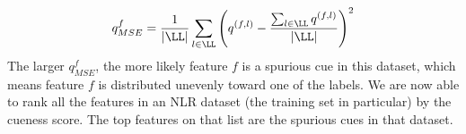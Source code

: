 \begin{equation}
q_{MSE}^{f} = \frac{1}{|\LL|} \sum_{l \in \LL}\left(q^{(f,l)} - \frac{\sum_{l \in \LL} q^{(f,l)}}{|\LL|}\right)^2
\end{equation}
The larger $q_{MSE}^f$, the more likely feature $f$ is a spurious cue in this dataset, which means
feature $f$ is distributed unevenly toward one of the labels. 
We are now able to rank all the features in an NLR dataset (the training set in particular)
by the cueness score. The top features on that list are the spurious cues in that dataset.
%
%
%
